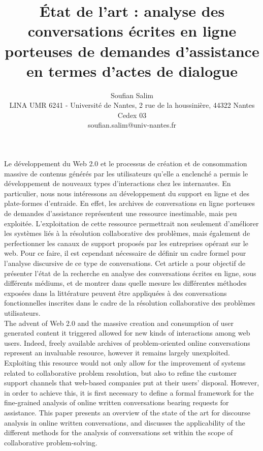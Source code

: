 \documentclass[10pt,a4paper,twoside]{article}
\title{État de l'art : analyse des conversations écrites en ligne porteuses de demandes d'assistance en termes d'actes de dialogue}
\author{Soufian Salim\\
  LINA UMR 6241 - Université de Nantes, 2 rue de la houssinière, 44322 Nantes Cedex 03 \\ 
  soufian.salim@univ-nantes.fr \\ 
}
\begin{document}
\maketitle

\resume
{Le développement du Web 2.0 et le processus de création et de consommation massive de contenus générés par les utilisateurs qu'elle a enclenché a permis le développement de nouveaux types d'interactions chez les internautes. En particulier, nous nous intéressons au développement du support en ligne et des plate-formes d'entraide. En effet, les archives de conversations en ligne porteuses de demandes d'assistance représentent une ressource inestimable, mais peu exploitée. L'exploitation de cette ressource permettrait non seulement d'améliorer les systèmes liés à la résolution collaborative des problèmes, mais également de perfectionner les canaux de support proposés par les entreprises opérant sur le web. Pour ce faire, il est cependant nécessaire de définir un cadre formel pour l'analyse discursive de ce type de conversations. Cet article a pour objectif de présenter l’état de la recherche en analyse des conversations écrites en ligne, sous différents médiums, et de montrer dans quelle mesure les différentes méthodes exposées dans la littérature peuvent être appliquées à des conversations fonctionnelles inscrites dans le cadre de la résolution collaborative des problèmes utilisateurs.}
\\

{The advent of Web 2.0 and the massive creation and consumption of user generated content it triggered allowed for new kinds of interactions among web users. Indeed, freely available archives of problem-oriented online conversations represent an invaluable resource, however it remains largely unexploited. Exploiting this resource would not only allow for the improvement of systems related to collaborative problem resolution, but also to refine the customer support channels that web-based companies put at their users' disposal. However, in order to achieve this, it is first necessary to define a formal framework for the fine-grained analysis of online written conversations bearing requests for assistance. This paper presents an overview of the state of the art for discourse analysis in online written conversations, and discusses the applicability of the different methods for the analysis of conversations set within the scope of collaborative problem-solving.}
\\
\end{document}
